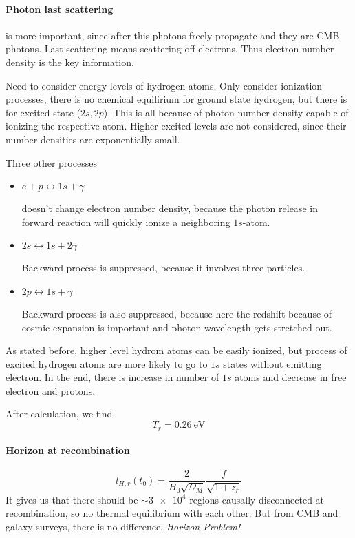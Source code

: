 \documentclass[12pt, a4paper, DIV=15]{article}
\numberwithin{equation}{section}
\begin{document}
\paragraph{Photon last scattering} is more important, since after this photons freely propagate and they are CMB photons. Last scattering means scattering off electrons. Thus electron number density is the key information.

Need to consider energy levels of hydrogen atoms. Only consider ionization processes, there is no chemical equilirium for ground state hydrogen, but there is for excited state ($2s, 2p$). This is all because of photon number density capable of ionizing the respective atom. Higher excited levels are not considered, since their number densities are exponentially small.

Three other processes
\begin{itemize}
   \item $e+ p \leftrightarrow 1s + \gamma$ 
     
      doesn't change electron number density, because the photon release in forward reaction will quickly ionize a neighboring $1s$-atom.
   \item $2s \leftrightarrow 1s + 2\gamma$

      Backward process is suppressed, because it involves three particles.

   \item $2p \leftrightarrow 1s + \gamma$

      Backward process is also suppressed, because here the redshift because of cosmic expansion is important and photon wavelength gets stretched out.
\end{itemize}

As stated before, higher level hydrom atoms can be easily ionized, but process of excited hydrogen atoms are more likely to go to $1s$ states without emitting electron. In the end, there is increase in number of $1s$ atoms and decrease in free electron and protons.

After calculation, we find
\begin{equation}
   T_r = \SI{0.26}{\eV}
\end{equation}

\paragraph{Horizon at recombination}
\begin{equation}
   l_{H,r}(t_0) = \frac{2}{H_0 \sqrt{\Omega_M}} \frac{f}{\sqrt{1+z_r}}
\end{equation}
It gives us that there should be $\sim \num{3e4}$ regions causally disconnected at recombination, so no thermal equilibrium with each other. But from CMB and galaxy surveys, there is no difference. \textit{Horizon Problem!}
\end{document}
